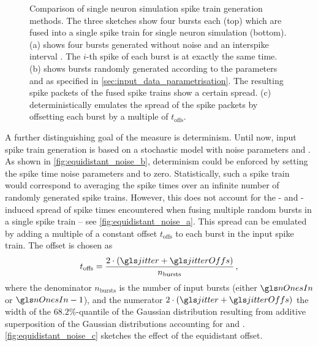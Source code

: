\begin{figure}
{		\label{fig:equidistant_noise_c}
	}%
	\caption[Comparison of single neuron simulation spike train generation methods]{Comparison of single neuron simulation spike train generation methods. The three sketches show four bursts each (top) which are fused into a single spike train for single neuron simulation (bottom). (a) shows four bursts generated without noise and an interspike interval \isi. The $i$-th spike of each burst is at exactly the same time. (b) shows bursts randomly generated according to the parameters \jitter and \jitterOffs as specified in \cref{sec:input_data_parametrisation}. The resulting spike packets of the fused spike trains show a certain spread. (c) deterministically emulates the spread of the spike packets by offsetting each burst by a multiple of $t_\mathrm{offs}$.}
	\label{fig:equidistant_noise}
\end{figure}

A further distinguishing goal of the \SGSO measure is determinism. Until now, input spike train generation is based on a stochastic model with noise parameters \jitter and \jitterOffs. As shown in \cref{fig:equidistant_noise_b}, determinism could be enforced by setting the spike time noise parameters \jitter and \jitterOffs to zero. Statistically, such a spike train would correspond to averaging the spike times over an infinite number of randomly generated spike trains. However, this does not account for the \jitter- and \jitterOffs-induced spread of spike times encountered when fusing multiple random bursts in a single spike train -- see \cref{fig:equidistant_noise_a}. This spread can be emulated by adding a multiple of a constant offset $t_\mathrm{offs}$ to each burst in the input spike train. The offset is chosen as
\begin{align}
	t_\mathrm{offs} = \frac{2 \cdot (\jitter + \jitterOffs)}{n_\mathrm{bursts}} \,,
\end{align}
where the denominator $n_\mathrm{bursts}$ is the number of input bursts (either $\nOnesIn$ or $\nOnesIn - 1$), and the numerator $2 \cdot (\jitter + \jitterOffs)$ the width of the $68.2\%$-quantile of the Gaussian distribution resulting from additive superposition of the Gaussian distributions accounting for \jitter and \jitterOffs. \cref{fig:equidistant_noise_c} sketches the effect of the equidistant offset.

